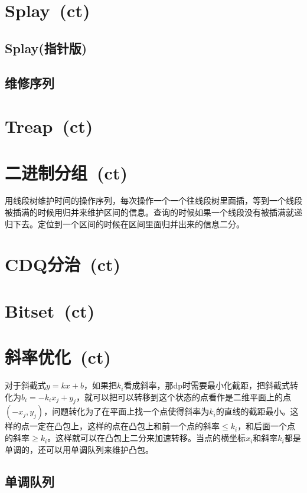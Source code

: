 \section{Splay\ \small(ct)}
    \subsection*{Splay(指针版)}
    \subsection*{维修序列}
\section{Treap\ \small(ct)}
\section{二进制分组\ \small(ct)}
    用线段树维护时间的操作序列，每次操作一个一个往线段树里面插，等到一个线段被插满的时候用归并来维护区间的信息。查询的时候如果一个线段没有被插满就递归下去。定位到一个区间的时候在区间里面归并出来的信息二分。
\section{CDQ分治\ \small(ct)}
\section{Bitset\ \small(ct)}
\section{斜率优化\ \small(ct)}
    对于斜截式$ y = k x + b $，如果把$ k_i $看成斜率，那dp时需要最小化截距，把斜截式转化为$ b_i = - k_i x_j + y_j $，就可以把可以转移到这个状态的点看作是二维平面上的点$ (- x_j, y_j) $，问题转化为了在平面上找一个点使得斜率为$ k_i $的直线的截距最小。这样的点一定在凸包上，这样的点在凸包上和前一个点的斜率$ \leq k_i$，和后面一个点的斜率$ \geq k_i $。这样就可以在凸包上二分来加速转移。当点的横坐标$ x_i $和斜率$ k_i $都是单调的，还可以用单调队列来维护凸包。
    \subsection*{单调队列}
